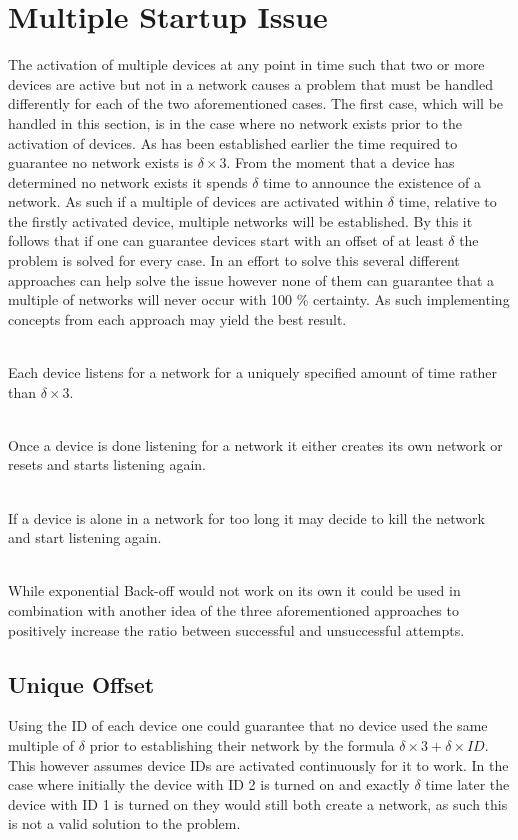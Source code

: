 \section{Multiple Startup Issue}\label{sec:MSI-CCRC}
The activation of multiple devices at any point in time such that two or more devices are active but not in a network causes a problem that must be handled differently for each of the two aforementioned cases.
The first case, which will be handled in this section, is in the case where no network exists prior to the activation of devices.
As has been established earlier the time required to guarantee no network exists is $\delta \times 3$.
From the moment that a device has determined no network exists it spends $\delta$ time to announce the existence of a network.
As such if a multiple of devices are activated within $\delta$ time, relative to the firstly activated device, multiple networks will be established.
By this it follows that if one can guarantee devices start with an offset of at least $\delta$ the problem is solved for every case.
In an effort to solve this several different approaches can help solve the issue however none of them can guarantee that a multiple of networks will never occur with 100 \% certainty. 
As such implementing concepts from each approach may yield the best result.

\begin{description}[labelindent=\parindent]
    \item[Unique Offset]\hfill\\
    Each device listens for a network for a uniquely specified amount of time rather than $\delta \times 3$.
    \item[Randomly Create]\hfill\\
    Once a device is done listening for a network it either creates its own network or resets and starts listening again.
    \item[Kill the Network]\hfill\\
    If a device is alone in a network for too long it may decide to kill the network and start listening again.
    \item[Exponential Back-off]\hfill\\ 
    While exponential Back-off would not work on its own it could be used in combination with another idea of the three aforementioned approaches to positively increase the ratio between successful and unsuccessful attempts.  
\end{description} 

\subsection{Unique Offset}
Using the ID of each device one could guarantee that no device used the same multiple of $\delta$ prior to establishing their network by the formula $\delta \times 3 + \delta \times ID$.
This however assumes device IDs are activated continuously for it to work.
In the case where initially the device with ID 2 is turned on and exactly $\delta$ time later the device with ID 1 is turned on they would still both create a network, as such this is not a valid solution to the problem.

